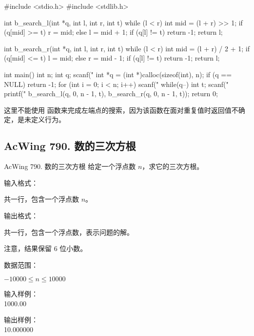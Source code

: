 \begin{mycpptwocol}
    #include <stdio.h>
    #include <stdlib.h>

    int b_search_l(int *q, int l,
    int r, int t) {
        while (l < r) {
            int mid = (l + r) >> 1;
            if (q[mid] >= t) {
                r = mid;
            } else {
                l = mid + 1;
            }
        }
        if (q[l] != t) {
            return -1;
        }
        return l;
    }

    int b_search_r(int *q, int l,
    int r, int t) {
        while (l < r) {
            int mid = (l + r) / 2 + 1;
            if (q[mid] <= t) {
                l = mid;
            } else {
                r = mid - 1;
            }
        }
        if (q[l] != t) {
            return -1;
        }
        return l;
    }

    int main() {
        int n;
        int q;
        scanf("%
        int *q = (int *)calloc(sizeof(int), n);
        if (q == NULL) {
            return -1;
        }
        for (int i = 0; i < n; i++) {
            scanf("%
        }
        while(q--) {
            int t;
            scanf("%
            printf("%
            b_search_l(q, 0, n - 1, t),
            b_search_r(q, 0, n - 1, t));
        }
        return 0;
    }
\end{mycpptwocol}

\begin{exclamation}
    这里不能使用 函数来完成左端点的搜索，因为该函数在面对重复值时返回值不确定，是未定义行为。
\end{exclamation}

\subsection{AcWing 790. 数的三次方根}
\begin{titledbox}{AcWing 790. 数的三次方根}
    给定一个浮点数 $n$，求它的三次方根。

    输入格式：

    共一行，包含一个浮点数 $n$。

    输出格式：

    共一行，包含一个浮点数，表示问题的解。

    注意，结果保留 $6$ 位小数。

    数据范围：

    $-10000 \le n \le 10000$

    \begin{minipage}[t]{.5\textwidth}
        输入样例：\\
        1000.00
    \end{minipage}%
    \begin{minipage}[t]{.5\textwidth}
        输出样例：\\
        10.000000
    \end{minipage}
\end{titledbox}

